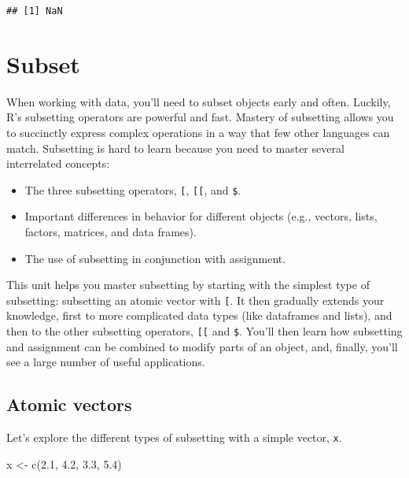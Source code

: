\documentclass[
]{book}
\newenvironment{Shaded}{\begin{snugshade}}{\end{snugshade}}
\newcommand{\FloatTok}[1]{\textcolor[rgb]{0.00,0.00,0.81}{#1}}
\newcommand{\FunctionTok}[1]{\textcolor[rgb]{0.00,0.00,0.00}{#1}}
\newcommand{\NormalTok}[1]{#1}
\newcommand{\OtherTok}[1]{\textcolor[rgb]{0.56,0.35,0.01}{#1}}
\begin{document}
\begin{verbatim}
## [1] NaN
\end{verbatim}

\hypertarget{subset}{%
\section{Subset}\label{subset}}

When working with data, you'll need to subset objects early and often. Luckily, R's subsetting operators are powerful and fast. Mastery of subsetting allows you to succinctly express complex operations in a way that few other languages can match. Subsetting is hard to learn because you need to master several interrelated concepts:

\begin{itemize}
\item
  The three subsetting operators, \texttt{{[}}, \texttt{{[}{[}}, and \texttt{\$}.
\item
  Important differences in behavior for different objects (e.g., vectors, lists, factors, matrices, and data frames).
\item
  The use of subsetting in conjunction with assignment.
\end{itemize}

This unit helps you master subsetting by starting with the simplest type of subsetting: subsetting an atomic vector with \texttt{{[}}. It then gradually extends your knowledge, first to more complicated data types (like dataframes and lists), and then to the other subsetting operators, \texttt{{[}{[}} and \texttt{\$}. You'll then learn how subsetting and assignment can be combined to modify parts of an object, and, finally, you'll see a large number of useful applications.

\hypertarget{atomic-vectors}{%
\subsection{Atomic vectors}\label{atomic-vectors}}

Let's explore the different types of subsetting with a simple vector, \texttt{x}.

\begin{Shaded}
\begin{Highlighting}[]
\NormalTok{x }\OtherTok{\textless{}{-}} \FunctionTok{c}\NormalTok{(}\FloatTok{2.1}\NormalTok{, }\FloatTok{4.2}\NormalTok{, }\FloatTok{3.3}\NormalTok{, }\FloatTok{5.4}\NormalTok{)}
\end{Highlighting}
\end{Shaded}
\end{document}
